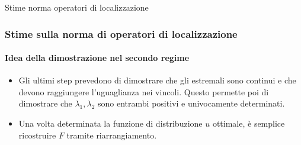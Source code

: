 \documentclass[aspectratio=141]{beamer}
\begin{document}
\begin{section}{Stime norma operatori di localizzazione}
	\begin{frame}
		\frametitle{Stime sulla norma di operatori di localizzazione}
		\framesubtitle{Idea della dimostrazione nel secondo regime}
		\begin{itemize}
			\item Gli ultimi step prevedono di dimostrare che gli estremali sono continui e che devono raggiungere l'uguaglianza nei vincoli. Questo permette poi di dimostrare che $\lambda_1, \lambda_2$ sono entrambi positivi e univocamente determinati.
			\pause
			\item Una volta determinata la funzione di distribuzione $u$ ottimale, è semplice ricostruire $F$ tramite riarrangiamento.
		\end{itemize}
	\end{frame}

\end{section}
\end{document}
